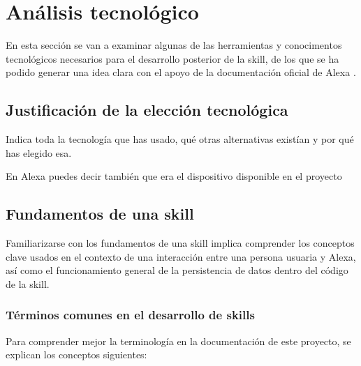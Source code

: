 \section{Análisis tecnológico}

En esta sección se van a examinar algunas de las herramientas y conocimentos tecnológicos necesarios para el desarrollo posterior de la skill, de los que se ha podido generar una idea clara con el apoyo de la documentación oficial de Alexa \parencite{alexaDocs}.

\subsection{Justificación de la elección tecnológica}

Indica toda la tecnología que has usado, qué otras alternativas existían y por qué has elegido esa. 

En Alexa puedes decir también que era el dispositivo disponible en el proyecto

\subsection{Fundamentos de una skill}

Familiarizarse con los fundamentos de una skill implica comprender los conceptos clave usados en el contexto de una interacción entre una persona usuaria y Alexa, así como el funcionamiento general de la persistencia de datos dentro del código de la skill.

\subsubsection{Términos comunes en el desarrollo de skills}

Para comprender mejor la terminología en la documentación de este proyecto, se explican los conceptos siguientes:

